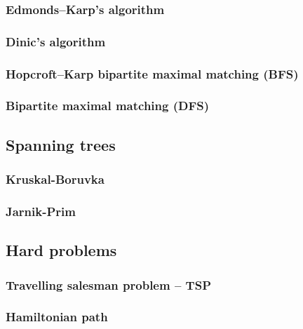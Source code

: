 \documentclass[a4paper]{article}
\begin{document}
\begin{multicols*}{2}
        \subsubsection{Edmonds--Karp's algorithm}
            
        \subsubsection{Dinic's algorithm}
            
        \subsubsection{Hopcroft–Karp bipartite maximal matching (BFS)}
            
        \subsubsection{Bipartite maximal matching (DFS)}
            

    \subsection{Spanning trees}
        \subsubsection{Kruskal-Boruvka}
            
        \subsubsection{Jarnik-Prim}
            
    \subsection{Hard problems}
        \subsubsection{Travelling salesman problem -- TSP}
            
        \subsubsection{Hamiltonian path}
            

\end{multicols*}
\end{document}
